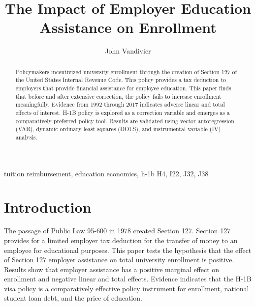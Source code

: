 \documentclass[review]{elsarticle}
\begin{document}
\begin{frontmatter}

    \title{
        The Impact of Employer Education Assistance on Enrollment
    }

    \author[mymainaddress]{John Vandivier} %
    \address[mymainaddress]{4400 University Dr, Fairfax, VA 22030}

    \begin{abstract}
        Policymakers incentivized university enrollment through the creation of Section 127 of the United States Internal Revenue Code.
        This policy provides a tax deduction to employers that provide financial assistance for employee education.
        This paper finds that before and after extensive correction, the policy fails to increase enrollment meaningfully.
        Evidence from 1992 through 2017 indicates adverse linear and total effects of interest.
        H-1B policy is explored as a correction variable and emerges as a comparatively preferred policy tool.
        Results are validated using vector autoregression (VAR), dynamic ordinary least squares (DOLS), and instrumental variable (IV) analysis.
    \end{abstract}

    \begin{keyword}
        tuition reimbursement, education economics, h-1b %
        \MSC[2010] H4, I22, J32, J38
    \end{keyword}
\end{frontmatter}

\pagebreak
\linenumbers

\section{Introduction}
The passage of Public Law 95-600 in 1978 created Section 127\cite{plaw95_600_1978}.
Section 127 provides for a limited employer tax deduction for the transfer of money to an employee for educational purposes.
This paper tests the hypothesis that the effect of Section 127 employer assistance on total university enrollment is positive.
Results show that employer assistance has a positive marginal effect on enrollment and negative linear and total effects.
Evidence indicates that the H-1B visa policy is a comparatively effective policy instrument for enrollment,
national student loan debt, and the price of education.
\end{document}
